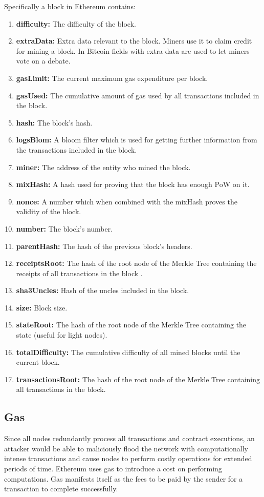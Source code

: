 Specifically a block in Ethereum contains:
\begin{enumerate}
    \item \textbf{difficulty:} The difficulty of the block.
    \item \textbf{extraData:} Extra data relevant to the block. Miners use it to claim credit for mining a block. In Bitcoin fields with extra data are used to let miners vote on a debate.
    \item \textbf{gasLimit:} The current maximum gas expenditure per block.
    \item \textbf{gasUsed:} The cumulative amount of gas used by all transactions included in the block.
    \item \textbf{hash:} The block's hash.
    \item \textbf{logsBlom:} A bloom filter which is used for getting further information from the transactions included in the block.
    \item \textbf{miner:} The address of the entity who mined the block.
    \item \textbf{mixHash:} A hash used for proving that the block has enough PoW on it.
    \item \textbf{nonce:} A number which when combined with the mixHash proves the validity of the block.
    \item \textbf{number:} The block's number.
    \item \textbf{parentHash:} The hash of the previous block's headers.
    \item \textbf{receiptsRoot:} The hash of the root node of the Merkle Tree containing the receipts of all transactions in the block .
    \item \textbf{sha3Uncles:} Hash of the uncles included in the block.
    \item \textbf{size:} Block size.
    \item \textbf{stateRoot:} The hash of the root node of the Merkle Tree containing the state (useful for light nodes).
    \item \textbf{totalDifficulty:} The cumulative difficulty of all mined blocks until the current block.
    \item \textbf{transactionsRoot:} The hash of the root node of the Merkle Tree containing all transactions in the block. 
\end{enumerate}

\subsection{Gas} \label{gas}
Since all nodes redundantly process all transactions and contract executions, an attacker would be able to maliciously flood the network with computationally intense transactions and cause nodes to perform costly operations for extended periods of time. Ethereum uses gas to introduce a cost on performing computations. Gas manifests itself as the fees to be paid by the sender for a transaction to complete successfully.


